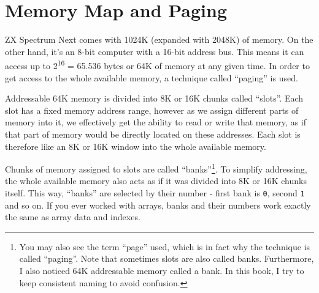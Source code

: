 \section{Memory Map and Paging}
\label{zx_next_memorypaging}


\newcommand{\MemEmpty}{\multicolumn{1}{c}{}}
\newcommand{\MemArrow}[1]{\multicolumn{1}{c}{\IfEq{#1}{<}{\LArrowLine{1em}}{\RArrowLine{1em}}}}

ZX Spectrum Next comes with 1024K (expanded with 2048K) of memory. On the other hand, it's an 8-bit computer with a 16-bit address bus. This means it can access up to 2\textsuperscript{16} = 65.536 bytes or 64K of memory at any given time. In order to get access to the whole available memory, a technique called ``paging'' is used. 

Addressable 64K memory is divided into 8K or 16K chunks called ``slots''. Each slot has a fixed memory address range, however as we assign different parts of memory into it, we effectively get the ability to read or write that memory, as if that part of memory would be directly located on these addresses. Each slot is therefore like an 8K or 16K window into the whole available memory.

Chunks of memory assigned to slots are called ``banks''\footnote{You may also see the term ``page'' used, which is in fact why the technique is called ``paging''. Note that sometimes slots are also called banks. Furthermore, I also noticed 64K addressable memory called a bank. In this book, I try to keep consistent naming to avoid confusion.}. To simplify addressing, the whole available memory also acts as if it was divided into 8K or 16K chunks itself. This way, ``banks'' are selected by their number - first bank is {\tt 0}, second {\tt 1} and so on. If you ever worked with arrays, banks and their numbers work exactly the same as array data and indexes.

